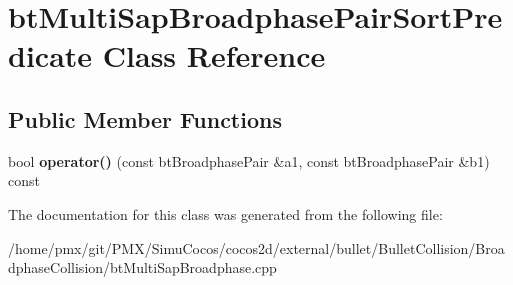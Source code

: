 \hypertarget{classbtMultiSapBroadphasePairSortPredicate}{}\section{bt\+Multi\+Sap\+Broadphase\+Pair\+Sort\+Predicate Class Reference}
\label{classbtMultiSapBroadphasePairSortPredicate}
\subsection*{Public Member Functions}
\begin{DoxyCompactItemize}
\item 
\mbox{\label{classbtMultiSapBroadphasePairSortPredicate_a21605a62a5946d3020693ee4cb76c3fd}} 
bool {\bfseries operator()} (const bt\+Broadphase\+Pair \&a1, const bt\+Broadphase\+Pair \&b1) const
\end{DoxyCompactItemize}


The documentation for this class was generated from the following file\+:\begin{DoxyCompactItemize}
\item 
/home/pmx/git/\+P\+M\+X/\+Simu\+Cocos/cocos2d/external/bullet/\+Bullet\+Collision/\+Broadphase\+Collision/bt\+Multi\+Sap\+Broadphase.\+cpp\end{DoxyCompactItemize}
